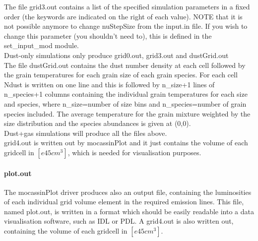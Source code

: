 \documentclass[11pt]{article}
\begin{document}
    The file grid3.out contains a list of the specified 
    simulation parameters in a fixed order (the keywords are indicated on the right 
    of each value). NOTE that it is not possible anymore to 
    change nuStepSize from the input.in file. If you wish to change this parameter 
    (you shouldn't need to), this is defined in the set\_input\_mod module.\\
    Dust-only simulations only produce grid0.out, grid3.out and dustGrid.out \\
    The file dustGrid.out contains the dust number density at each cell followed 
    by the grain temperatures for each grain size of each grain species. 
    For each cell Ndust is written on one line and this is followed by n\_size+1 
    lines of n\_species+1 columns containing the individual grain temperatures for 
    each size and species, where n\_size=number of size bins and n\_species=number 
    of grain species included. The average temperature for the grain mixture 
    weighted by the size distribution and the species abundances is given at 
    (0,0). \\
    Dust+gas simulations will produce all the files above. \\
    grid4.out is written out by mocassinPlot and it just contains the volume of each
    gridcell in $[e45 cm^3]$, which is needed for visualisation purposes.\\

\paragraph{    plot.out}
    The {\sc mocassin}Plot driver produces also an output file, containing the 
    luminosities of each individual grid volume element in the required emission 
    lines. This file, named 
    plot.out, is written in a format which should be easily readable into a 
    data visualisation software, such as IDL or PDL. A grid4.out is also written out, 
    containing the volume of each gridcell in $[e45 cm^3]$.\\


\\ 
\\
\\
\end{document}
